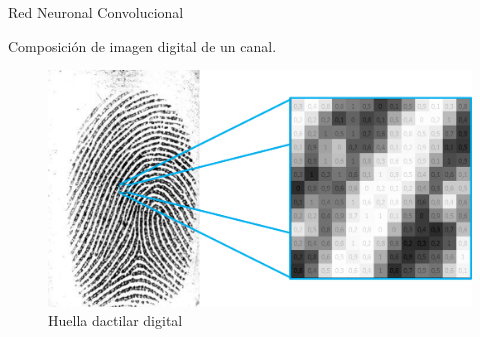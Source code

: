 \documentclass[12pt,aspectratio=169]{beamer}
\begin{document}
\begin{frame}{Red Neuronal Convolucional}

    Composición de imagen digital de un canal.

    \begin{figure}
        \includegraphics[scale=0.45]{figs/huella_pixeles_numeros.png}
        \caption{Huella dactilar digital}
    \end{figure}

\end{frame}
\end{document}
